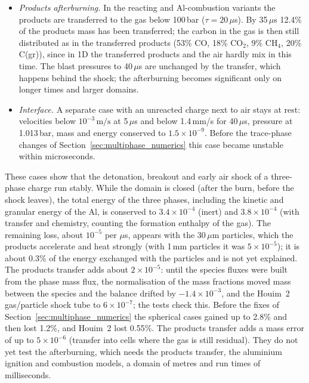 \documentclass{article}
\begin{document}
\begin{itemize}
    \item \emph{Products afterburning.} In the reacting and Al-combustion variants the products are transferred to the gas below 100\,bar ($\tau = 20\,\mu$s). By 35\,$\mu$s 12.4\% of the products mass has been transferred; the carbon in the gas is then still distributed as in the transferred products (53\% CO, 18\% CO$_2$, 9\% CH$_4$, 20\% C(gr)), since in 1D the transferred products and the air hardly mix in this time. The blast pressures to 40\,$\mu$s are unchanged by the transfer, which happens behind the shock; the afterburning becomes significant only on longer times and larger domains.
    \item \emph{Interface.} A separate case with an unreacted charge next to air stays at rest: velocities below $10^{-3}\,\text{m/s}$ at 5\,$\mu$s and below 1.4\,mm/s for 40\,$\mu$s, pressure at 1.013\,bar, mass and energy conserved to $1.5\times10^{-9}$. Before the trace-phase changes of Section~\ref{sec:multiphase_numerics} this case became unstable within microseconds.
\end{itemize}

These cases show that the detonation, breakout and early air shock of a three-phase charge run stably. While the domain is closed (after the burn, before the shock leaves), the total energy of the three phases, including the kinetic and granular energy of the Al, is conserved to $3.4\times10^{-4}$ (inert) and $3.8\times10^{-4}$ (with transfer and chemistry, counting the formation enthalpy of the gas). The remaining loss, about $10^{-5}$ per $\mu$s, appears with the 30\,$\mu$m particles, which the products accelerate and heat strongly (with 1\,mm particles it was $5\times10^{-5}$); it is about 0.3\% of the energy exchanged with the particles and is not yet explained. The products transfer adds about $2\times10^{-5}$: until the species fluxes were built from the phase mass flux, the normalisation of the mass fractions moved mass between the species and the balance drifted by $-1.4\times10^{-3}$, and the Houim~2 gas/particle shock tube to $6\times10^{-7}$; the tests check this. Before the fixes of Section~\ref{sec:multiphase_numerics} the spherical cases gained up to 2.8\% and then lost 1.2\%, and Houim~2 lost 0.55\%. The products transfer adds a mass error of up to $5\times10^{-6}$ (transfer into cells where the gas is still residual). They do not yet test the afterburning, which needs the products transfer, the aluminium ignition and combustion models, a domain of metres and run times of milliseconds.
\end{document}
